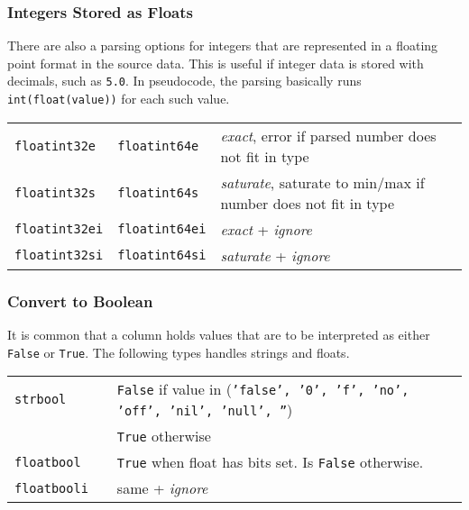 \subsubsection{Integers Stored as Floats}

There are also a parsing options for integers that are represented in
a floating point format in the source data.  This is useful if integer
data is stored with decimals, such as \texttt{5.0}.  In pseudocode,
the parsing basically runs \texttt{int(float(value))} for each such
value.\\

\begin{tabular}{p{2cm}p{2cm}l}
  \texttt{floatint32e} & \texttt{floatint64e}  & \emph{exact}, error if parsed number does not fit in type\\
  \texttt{floatint32s} & \texttt{floatint64s}  & \emph{saturate}, saturate to min/max if number does not fit in type\\
  \texttt{floatint32ei}& \texttt{floatint64ei} & \emph{exact} + \emph{ignore}\\
  \texttt{floatint32si}& \texttt{floatint64si} & \emph{saturate} + \emph{ignore}\\
\end{tabular}



\subsubsection{Convert to Boolean}
It is common that a column holds values that are to be interpreted as
either \texttt{False} or \texttt{True}.  The following types handles
strings and floats.\\

\begin{tabular}{p{2cm}p{2cm}p{8cm}}
  \texttt{strbool} && \texttt{False} if value in (\texttt{'false', '0', 'f', 'no', 'off', 'nil', 'null', ''})\\
                   && \texttt{True} otherwise\\[1ex]

  \texttt{floatbool} && \texttt{True} when float has bits
  set. Is \texttt{False} otherwise.\\[1ex]

  \texttt{floatbooli} && same + \emph{ignore}\\[1ex]
\end{tabular}



